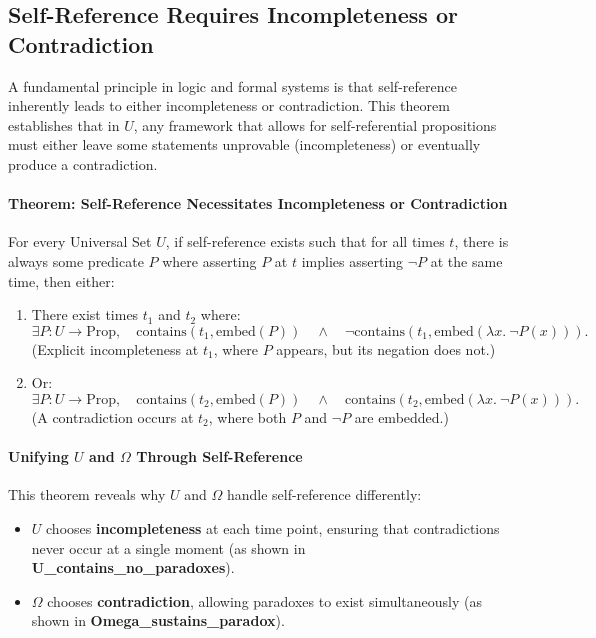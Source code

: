 \documentclass[12pt]{article}
\begin{document}
\subsection{Self-Reference Requires Incompleteness or Contradiction}

A fundamental principle in logic and formal systems is that self-reference inherently leads to either incompleteness or contradiction. This theorem establishes that in \( U \), any framework that allows for self-referential propositions must either leave some statements unprovable (incompleteness) or eventually produce a contradiction.

\paragraph{Theorem: Self-Reference Necessitates Incompleteness or Contradiction}
For every Universal Set \( U \), if self-reference exists such that for all times \( t \), there is always some predicate \( P \) where asserting \( P \) at \( t \) implies asserting \( \neg P \) at the same time, then either:

\begin{enumerate}
    \item There exist times \( t_1 \) and \( t_2 \) where:
    \[
    \exists P: U \to \text{Prop}, \quad \text{contains}(t_1, \text{embed}(P)) \quad \wedge \quad \neg \text{contains}(t_1, \text{embed}(\lambda x.\ \neg P(x))).
    \]
    (Explicit incompleteness at \( t_1 \), where \( P \) appears, but its negation does not.)
    
    \item Or:
    \[
    \exists P: U \to \text{Prop}, \quad \text{contains}(t_2, \text{embed}(P)) \quad \wedge \quad \text{contains}(t_2, \text{embed}(\lambda x.\ \neg P(x))).
    \]
    (A contradiction occurs at \( t_2 \), where both \( P \) and \( \neg P \) are embedded.)
\end{enumerate}

\paragraph{Unifying \( U \) and \( \Omega \) Through Self-Reference}
This theorem reveals why \( U \) and \( \Omega \) handle self-reference differently:
\begin{itemize}
    \item \( U \) chooses \textbf{incompleteness} at each time point, ensuring that contradictions never occur at a single moment (as shown in \textbf{U\_contains\_no\_paradoxes}).
    \item \( \Omega \) chooses \textbf{contradiction}, allowing paradoxes to exist simultaneously (as shown in \textbf{Omega\_sustains\_paradox}).
\end{itemize}
\end{document}
